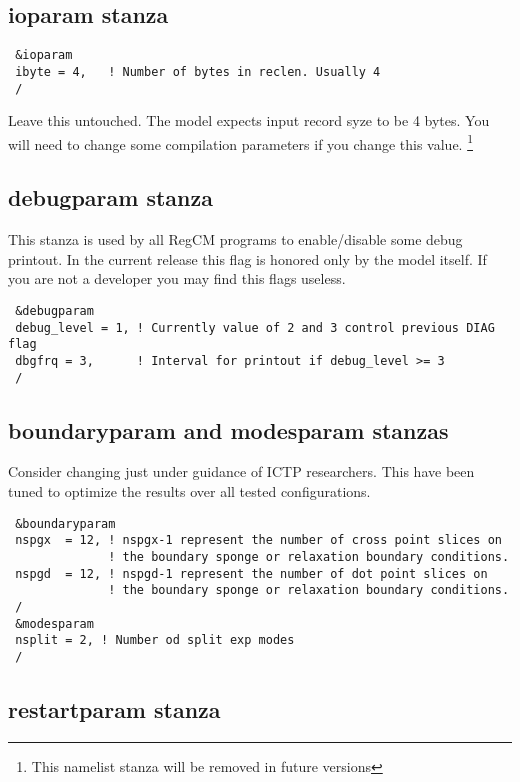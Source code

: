 \subsection{ioparam stanza}

{\footnotesize
\begin{Verbatim}
 &ioparam
 ibyte = 4,   ! Number of bytes in reclen. Usually 4
 /
\end{Verbatim}
}

Leave this untouched. The model expects input record syze to be 4 bytes.
You will need to change some compilation parameters if you change this value.
\footnote{This namelist stanza will be removed in future versions}

\subsection{debugparam stanza}

This stanza is used by all RegCM programs to enable/disable some debug printout.
In the current release this flag is honored only by the model itself. If you
are not a developer you may find this flags useless.

{\footnotesize
\begin{Verbatim}
 &debugparam
 debug_level = 1, ! Currently value of 2 and 3 control previous DIAG flag
 dbgfrq = 3,      ! Interval for printout if debug_level >= 3
 /
\end{Verbatim}
}

\subsection{boundaryparam and modesparam stanzas}

Consider changing just under guidance of ICTP researchers. This have been
tuned to optimize the results over all tested configurations.

{\footnotesize
\begin{Verbatim}
 &boundaryparam
 nspgx  = 12, ! nspgx-1 represent the number of cross point slices on
              ! the boundary sponge or relaxation boundary conditions.
 nspgd  = 12, ! nspgd-1 represent the number of dot point slices on
              ! the boundary sponge or relaxation boundary conditions.
 /
 &modesparam
 nsplit = 2, ! Number od split exp modes
 /
\end{Verbatim}
}

\subsection{restartparam stanza}

